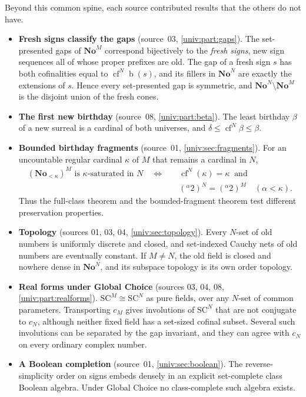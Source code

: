 \documentclass[11pt,letterpaper]{article}
\numberwithin{equation}{section}
\theoremstyle{definition}
\theoremstyle{remark}
\newcommand{\No}{\mathbf{No}}
\newcommand{\SC}{\mathrm{SC}}
\newcommand{\NoM}{\No^{M}}
\newcommand{\NoN}{\No^{N}}
\newcommand{\SCM}{\SC^{M}}
\newcommand{\SCN}{\SC^{N}}
\newcommand{\bd}{\operatorname{b}}
\newcommand{\cf}{\operatorname{cf}}
\begin{document}
Beyond this common spine, each source contributed results that the others do
not have.
\begin{itemize}
\item \textbf{Fresh signs classify the gaps} (source~03,
\cref{univ:part:gaps}). The set-presented gaps of $\NoM$ correspond
bijectively to the \emph{fresh signs}, new sign sequences all of whose proper
prefixes are old. The gap of a fresh sign $s$ has both cofinalities equal to
$\cf^N\bd(s)$, and its fillers in $\NoN$ are exactly the extensions of $s$.
Hence every set-presented gap is symmetric, and $\NoN\setminus\NoM$ is the
disjoint union of the fresh cones.
\item \textbf{The first new birthday} (source~08, \cref{univ:part:beta}). The
least birthday $\beta$ of a new surreal is a cardinal of both universes, and
$\delta\le\cf^N\beta\le\beta$.
\item \textbf{Bounded birthday fragments} (source~01,
\cref{univ:sec:fragments}). For an uncountable regular cardinal $\kappa$ of
$M$ that remains a cardinal in $N$,
\begin{equation}\label{univ:eq:bounded-summary}
\begin{split}
 (\No_{<\kappa})^M\text{ is }\kappa\text{-saturated in }N
 \quad\Longleftrightarrow\quad&
 \cf^N(\kappa)=\kappa\ \text{ and}\\[-2pt]
 &({}^\alpha 2)^N=({}^\alpha 2)^M\quad(\alpha<\kappa).
\end{split}
\end{equation}
Thus the full-class theorem and the bounded-fragment theorem test different
preservation properties.
\item \textbf{Topology} (sources 01, 03, 04, \cref{univ:sec:topology}). Every
$N$-set of old numbers is uniformly discrete and closed, and set-indexed Cauchy
nets of old numbers are eventually constant. If $M\ne N$, the old field is
closed and nowhere dense in $\NoN$, and its subspace topology is its own order
topology.
\item \textbf{Real forms under Global Choice} (sources 03, 04, 08,
\cref{univ:part:realforms}). $\SCM\cong\SCN$ as pure fields, over any $N$-set
of common parameters. Transporting $c_M$ gives involutions of $\SCN$ that are
not conjugate to $c_N$, although neither fixed field has a set-sized cofinal
subset. Several such involutions can be separated by the gap invariant, and
they can agree with $c_N$ on every ordinary complex number.
\item \textbf{A Boolean completion} (source~01, \cref{univ:sec:boolean}). The
reverse-simplicity order on signs embeds densely in an explicit set-complete
class Boolean algebra. Under Global Choice no class-complete such algebra
exists.
\end{itemize}
\end{document}
